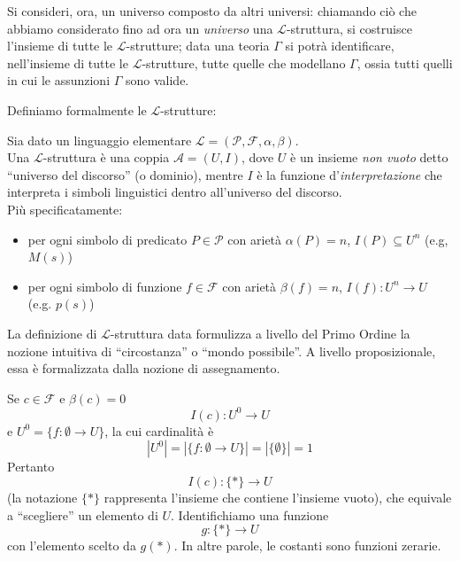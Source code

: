 Si consideri, ora,  un universo composto da altri universi: chiamando 
ciò che abbiamo considerato fino ad ora 
un \textit{universo} una $\mathscr{L}$-struttura, si costruisce l'insieme 
di tutte le $\mathscr{L}$-strutture; data una teoria $\Gamma$ si potrà identificare, 
nell'insieme di tutte le $\mathscr{L}$-strutture, tutte quelle che modellano $\Gamma$, ossia tutti quelli in cui le assunzioni $\Gamma$ sono valide. 

Definiamo formalmente le $\mathscr{L}$-strutture:
\begin{defi}
Sia dato un linguaggio elementare $\mathscr{L}  = (\mathscr{P}, \mathscr{F}, \alpha, \beta)$. \\
Una $\mathscr{L}$-struttura è una coppia $\mathscr{A} = (U, I)$, dove $U$ è un insieme \textit{non vuoto} detto ``universo del discorso'' (o dominio), mentre $I$ è la funzione d'\textit{interpretazione} che interpreta i simboli linguistici dentro all'universo del discorso. \\
Più specificatamente:
\begin{itemize}
  \item per ogni simbolo di predicato $P \in \mathscr{P}$ con arietà $\alpha(P) = n$, $I(P) \subseteq U^{n}$ (e.g, $M(s)$)
  \item per ogni simbolo di funzione $f \in \mathscr{F}$ con arietà $\beta(f) = n$, $I(f) : U^{n} \rightarrow U$ (e.g. $p(s)$)
\end{itemize}
\end{defi}

La definizione di $\mathscr{L}$-struttura data formulizza a livello del Primo Ordine la nozione intuitiva di ``circostanza'' o ``mondo possibile''. A livello proposizionale, 
essa è formalizzata dalla nozione di assegnamento. 


\begin{oss}[Costanti]
        Se $c \in \mathscr{F}$ e $\beta(c) = 0$ 
        $$
        I(c) : U^{0} \rightarrow U
        $$
        e $U^{0} = \{f: \emptyset  \rightarrow U\}$, la cui cardinalità è  
        $$ 
        |U^0| = |\{f: \emptyset \rightarrow U\}| = |\{\emptyset\}| = 1
        $$
        Pertanto 
        $$
        I(c): \{*\} \rightarrow U
        $$ 
(la notazione $\{*\}$
        rappresenta 
        l'insieme che contiene l'insieme vuoto), che equivale a 
        ``scegliere'' un elemento di $U$.
        Identifichiamo una funzione 
        $$
        g : \{*\} \rightarrow U
        $$
        con l'elemento scelto da $g(*)$. In altre parole, le costanti sono funzioni
        zerarie.
\end{oss}


